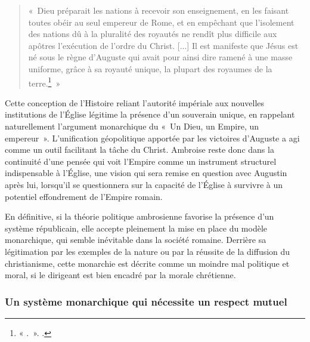 \begin{quote}
    «~Dieu préparait les nations à recevoir son enseignement, en les faisant toutes obéir au seul empereur de Rome, et en empêchant que l’isolement des nations dû à la pluralité des royautés ne rendît plus difficile aux apôtres l’exécution de l’ordre du Christ. [...] Il est manifeste que Jésus est né sous le règne d’Auguste qui avait pour ainsi dire ramené à une masse uniforme, grâce à sa royauté unique, la plupart des royaumes de la terre.\footnote{« .~». \cite[\nopp II, 30]{origene_celse}.}~»
\end{quote}

\bigskip

Cette conception de l'Histoire reliant l'autorité impériale aux nouvelles institutions de l'Église légitime la présence d'un souverain unique, en rappelant naturellement l'argument monarchique du «~Un Dieu, un Empire, un empereur\autocite[681]{dvornik_political}~». L'unification géopolitique apportée par les victoires d'Auguste a agi comme un outil facilitant la tâche du Christ. Ambroise reste donc dans la continuité d'une pensée qui voit l'Empire comme un instrument structurel indispensable à l'Église, une vision qui sera remise en question avec Augustin après lui, lorsqu'il se questionnera sur la capacité de l'Église à survivre à un potentiel effondrement de l'Empire romain.

\bigskip

En définitive, si la théorie politique ambrosienne favorise la présence d'un système républicain, elle accepte pleinement la mise en place du modèle monarchique, qui semble inévitable dans la société romaine. Derrière sa légitimation par les exemples de la nature ou par la réussite de la diffusion du christianisme, cette monarchie est décrite comme un moindre mal politique et moral, si le dirigeant est bien encadré par la morale chrétienne.

\bigskip

\subsubsection{Un système monarchique qui nécessite un respect mutuel}

